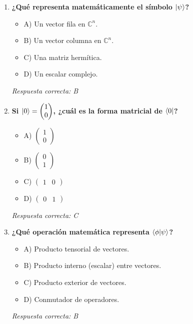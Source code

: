 \documentclass{unirTema}
\begin{document}
\begin{enumerate}
  \item \textbf{¿Qué representa matemáticamente el símbolo $\ket{\psi}$?}
        \begin{itemize}
          \item A) Un vector fila en $\mathbb{C}^n$.
          \item B) Un vector columna en $\mathbb{C}^n$.
          \item C) Una matriz hermítica.
          \item D) Un escalar complejo.
        \end{itemize}
        \textit{Respuesta correcta: B}

  \item \textbf{Si $\ket{0} = \begin{pmatrix} 1 \\ 0 \end{pmatrix}$, ¿cuál es la forma matricial de $\bra{0}$?}
        \begin{itemize}
          \item A) $\begin{pmatrix} 1 \\ 0 \end{pmatrix}$
          \item B) $\begin{pmatrix} 0 \\ 1 \end{pmatrix}$
          \item C) $\begin{pmatrix} 1 & 0 \end{pmatrix}$
          \item D) $\begin{pmatrix} 0 & 1 \end{pmatrix}$
        \end{itemize}
        \textit{Respuesta correcta: C}

  \item \textbf{¿Qué operación matemática representa $\braket{\phi}{\psi}$?}
        \begin{itemize}
          \item A) Producto tensorial de vectores.
          \item B) Producto interno (escalar) entre vectores.
          \item C) Producto exterior de vectores.
          \item D) Conmutador de operadores.
        \end{itemize}
        \textit{Respuesta correcta: B}


\end{enumerate}
\end{document}
